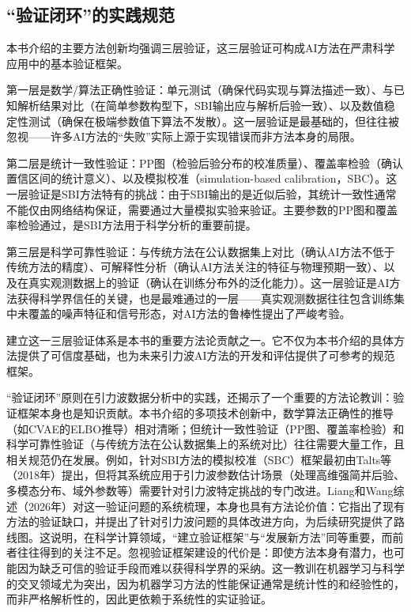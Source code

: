 \subsection{“验证闭环”的实践规范}

本书介绍的主要方法创新均强调三层验证，这三层验证可构成AI方法在严肃科学应用中的基本验证框架。

第一层是数学/算法正确性验证：单元测试（确保代码实现与算法描述一致）、与已知解析结果对比（在简单参数构型下，SBI输出应与解析后验一致）、以及数值稳定性测试（确保在极端参数值下算法不发散）。这一层验证是最基础的，但往往被忽视——许多AI方法的“失败”实际上源于实现错误而非方法本身的局限。

第二层是统计一致性验证：PP图（检验后验分布的校准质量）、覆盖率检验（确认置信区间的统计意义）、以及模拟校准（simulation-based calibration，SBC）。这一层验证是SBI方法特有的挑战：由于SBI输出的是近似后验，其统计一致性通常不能仅由网络结构保证，需要通过大量模拟实验来验证。主要参数的PP图和覆盖率检验通过，是SBI方法用于科学分析的重要前提。

第三层是科学可靠性验证：与传统方法在公认数据集上对比（确认AI方法不低于传统方法的精度）、可解释性分析（确认AI方法关注的特征与物理预期一致）、以及在真实观测数据上的验证（确认在训练分布外的泛化能力）。这一层验证是AI方法获得科学界信任的关键，也是最难通过的一层——真实观测数据往往包含训练集中未覆盖的噪声特征和信号形态，对AI方法的鲁棒性提出了严峻考验。

建立这一三层验证体系是本书的重要方法论贡献之一。它不仅为本书介绍的具体方法提供了可信度基础，也为未来引力波AI方法的开发和评估提供了可参考的规范框架。

“验证闭环”原则在引力波数据分析中的实践，还揭示了一个重要的方法论教训：验证框架本身也是知识贡献。本书介绍的多项技术创新中，数学算法正确性的推导（如CVAE的ELBO推导）相对清晰；但统计一致性验证（PP图、覆盖率检验）和科学可靠性验证（与传统方法在公认数据集上的系统对比）往往需要大量工作，且相关规范仍在发展。例如，针对SBI方法的模拟校准（SBC）框架最初由Talts等（2018年）提出，但将其系统应用于引力波参数估计场景（处理高维强简并后验、多模态分布、域外参数等）需要针对引力波特定挑战的专门改进。Liang和Wang综述（2026年）对这一验证问题的系统梳理，本身也具有方法论价值：它指出了现有方法的验证缺口，并提出了针对引力波问题的具体改进方向，为后续研究提供了路线图。这说明，在科学计算领域，“建立验证框架”与“发展新方法”同等重要，而前者往往得到的关注不足。忽视验证框架建设的代价是：即使方法本身有潜力，也可能因为缺乏可信的验证手段而难以获得科学界的采纳。这一教训在机器学习与科学的交叉领域尤为突出，因为机器学习方法的性能保证通常是统计性的和经验性的，而非严格解析性的，因此更依赖于系统性的实证验证。

